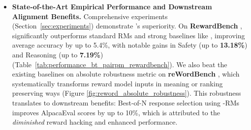 \begin{itemize}[left=2pt,itemsep=0pt]
    \item \textbf{State-of-the-Art Empirical Performance and Downstream Alignment Benefits.}
    Comprehensive experiments (Section~\ref{sec:experiments}) demonstrate \carma{}'s superiority. On \textbf{RewardBench} \citep{lambert2024rewardbench}, \carma{} significantly outperforms standard RMs and strong baselines like \rrm{} \citep{liu2024rrm}, improving average accuracy by up to 5.4\%, with notable gains in Safety (up to \textbf{13.18\%}) and Reasoning (up to \textbf{7.19\%}) (Table~\ref{tab:performance_bt_pairpm_rewardbench}). We also beat the existing baselines on absolute robustness metric on \textbf{reWordBench} \citep{wu2025rewordbench}, which systematically transforms reward model inputs in meaning or ranking preserving ways (Figure \ref{fig:reword_absolute_robustness}). This robustness translates to downstream benefits: Best-of-N response selection using \carma{}-RMs improves AlpacaEval scores by up to 10\%, which is attributed to the \textit{diminished} reward hacking and enhanced performance.
\end{itemize}